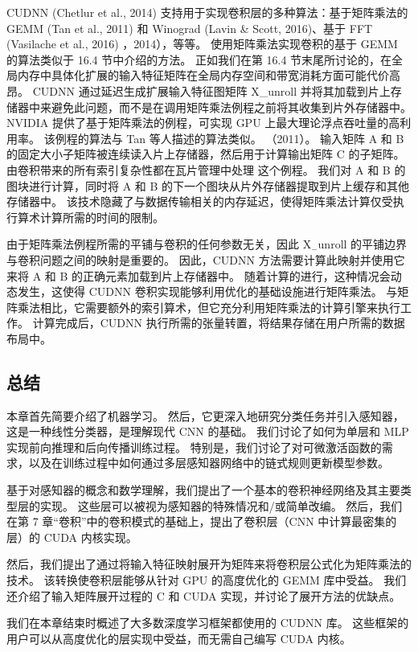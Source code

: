 CUDNN (Chetlur et al., 2014) 支持用于实现卷积层的多种算法：基于矩阵乘法的 GEMM (Tan et al., 2011) 和 Winograd (Lavin \& Scott, 2016)、基于 FFT (Vasilache et al., 2016) ，2014），等等。 使用矩阵乘法实现卷积的基于 GEMM 的算法类似于 16.4 节中介绍的方法。 正如我们在第 16.4 节末尾所讨论的，在全局内存中具体化扩展的输入特征矩阵在全局内存空间和带宽消耗方面可能代价高昂。 CUDNN 通过延迟生成扩展输入特征图矩阵 X\_unroll 并将其加载到片上存储器中来避免此问题，而不是在调用矩阵乘法例程之前将其收集到片外存储器中。 NVIDIA 提供了基于矩阵乘法的例程，可实现 GPU 上最大理论浮点吞吐量的高利用率。 该例程的算法与 Tan 等人描述的算法类似。 （2011）。 输入矩阵 A 和 B 的固定大小子矩阵被连续读入片上存储器，然后用于计算输出矩阵 C 的子矩阵。由卷积带来的所有索引复杂性都在瓦片管理中处理 这个例程。 我们对 A 和 B 的图块进行计算，同时将 A 和 B 的下一个图块从片外存储器提取到片上缓存和其他存储器中。 该技术隐藏了与数据传输相关的内存延迟，使得矩阵乘法计算仅受执行算术计算所需的时间的限制。


由于矩阵乘法例程所需的平铺与卷积的任何参数无关，因此 $\mathrm{X}_{-}$unroll 的平铺边界与卷积问题之间的映射是重要的。 因此，CUDNN 方法需要计算此映射并使用它来将 A 和 B 的正确元素加载到片上存储器中。 随着计算的进行，这种情况会动态发生，这使得 CUDNN 卷积实现能够利用优化的基础设施进行矩阵乘法。 与矩阵乘法相比，它需要额外的索引算术，但它充分利用矩阵乘法的计算引擎来执行工作。 计算完成后，CUDNN 执行所需的张量转置，将结果存储在用户所需的数据布局中。

\subsection{总结}
本章首先简要介绍了机器学习。 然后，它更深入地研究分类任务并引入感知器，这是一种线性分类器，是理解现代 CNN 的基础。 我们讨论了如何为单层和 MLP 实现前向推理和后向传播训练过程。 特别是，我们讨论了对可微激活函数的需求，以及在训练过程中如何通过多层感知器网络中的链式规则更新模型参数。

基于对感知器的概念和数学理解，我们提出了一个基本的卷积神经网络及其主要类型层的实现。 这些层可以被视为感知器的特殊情况和/或简单改编。 然后，我们在第 7 章“卷积”中的卷积模式的基础上，提出了卷积层（CNN 中计算最密集的层）的 CUDA 内核实现。

然后，我们提出了通过将输入特征映射展开为矩阵来将卷积层公式化为矩阵乘法的技术。 该转换使卷积层能够从针对 GPU 的高度优化的 GEMM 库中受益。 我们还介绍了输入矩阵展开过程的 C 和 CUDA 实现，并讨论了展开方法的优缺点。

我们在本章结束时概述了大多数深度学习框架都使用的 CUDNN 库。 这些框架的用户可以从高度优化的层实现中受益，而无需自己编写 CUDA 内核。